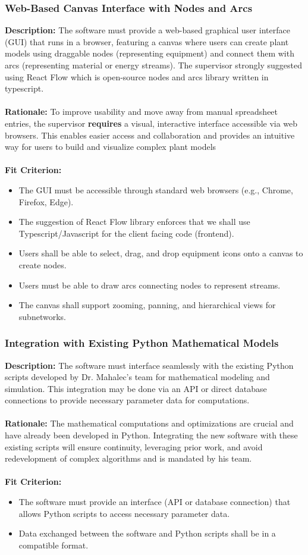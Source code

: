 \documentclass[12pt]{article}
\begin{document}
\subsubsection{Web-Based Canvas Interface with Nodes and Arcs}
\textbf{Description:} The software must provide a web-based graphical user interface (GUI) that runs in a browser, featuring a canvas where users can create plant models using draggable nodes (representing equipment) and connect them with arcs (representing material or energy streams). The supervisor strongly suggested using React Flow which is open-source nodes and arcs library written in typescript.\\\\
\textbf{Rationale:} To improve usability and move away from manual spreadsheet entries, the supervisor \textbf{requires} a visual, interactive interface accessible via web browsers. This enables easier access and collaboration and provides an intuitive way for users to build and visualize complex plant models\\\\
\textbf{Fit Criterion:} 
\begin{itemize}
  \item The GUI must be accessible through standard web browsers (e.g., Chrome, Firefox, Edge).
  \item The suggestion of React Flow library enforces that we shall use Typescript/Javascript for the client facing code (frontend).
  \item Users shall be able to select, drag, and drop equipment icons onto a canvas to create nodes.
  \item Users must be able to draw arcs connecting nodes to represent streams.
  \item The canvas shall support zooming, panning, and hierarchical views for subnetworks.
\end{itemize}
\subsubsection{Integration with Existing Python Mathematical Models}
\textbf{Description:} The software must interface seamlessly with the existing Python scripts developed by Dr. Mahalec's team for mathematical modeling and simulation. This integration may be done via an API or direct database connections to provide necessary parameter data for computations.\\\\
\textbf{Rationale:} The mathematical computations and optimizations are crucial and have already been developed in Python. Integrating the new software with these existing scripts will ensure continuity, leveraging prior work, and avoid redevelopment of complex algorithms and is mandated by his team.\\\\
\textbf{Fit Criterion:} 
\begin{itemize}
  \item The software must provide an interface (API or database connection) that allows Python scripts to access necessary parameter data.
  \item Data exchanged between the software and Python scripts shall be in a compatible format.
\end{itemize}
\end{document}
